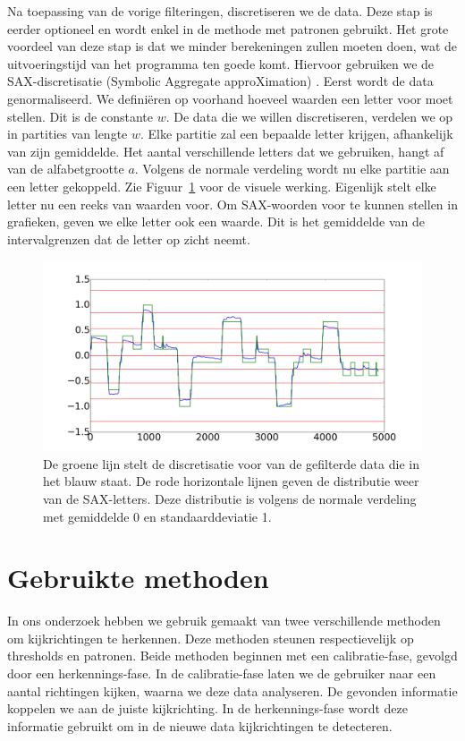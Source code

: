 \documentclass{article}
\begin{document}
Na toepassing van de vorige filteringen, discretiseren we de data. Deze stap is eerder optioneel en wordt enkel in de methode met patronen gebruikt. Het grote voordeel van deze stap is dat we minder berekeningen zullen moeten doen, wat de uitvoeringstijd van het programma ten goede komt. Hiervoor gebruiken we de SAX-discretisatie (Symbolic Aggregate approXimation) \cite{sax}. Eerst wordt de data genormaliseerd. We definiëren op voorhand hoeveel waarden een letter voor moet stellen. Dit is de constante $w$. De data die we willen discretiseren, verdelen we op in partities van lengte $w$. Elke partitie zal een bepaalde letter krijgen, afhankelijk van zijn gemiddelde. Het aantal verschillende letters dat we gebruiken, hangt af van de alfabetgrootte $a$. Volgens de normale verdeling wordt nu elke partitie aan een letter gekoppeld. Zie Figuur~\ref{fig:discretization} voor de visuele werking. Eigenlijk stelt elke letter nu een reeks van waarden voor. Om SAX-woorden voor te kunnen stellen in grafieken, geven we elke letter ook een waarde. Dit is het gemiddelde van de intervalgrenzen dat de letter op zicht neemt.

\begin{figure}[h]
\centering
\includegraphics[width=\linewidth]{images/sax_normaal_verdeling}
\caption{De groene lijn stelt de discretisatie voor van de gefilterde data die in het blauw staat. De rode horizontale lijnen geven de distributie weer van de SAX-letters. Deze distributie is volgens de normale verdeling met gemiddelde 0 en standaarddeviatie 1.}
\label{fig:discretization}
\end{figure}

\section{Gebruikte methoden}

In ons onderzoek hebben we gebruik gemaakt van twee verschillende methoden om kijkrichtingen te herkennen. Deze methoden steunen respectievelijk op thresholds en patronen. Beide methoden beginnen met een calibratie-fase, gevolgd door een herkennings-fase. In de calibratie-fase laten we de gebruiker naar een aantal richtingen kijken, waarna we deze data analyseren. De gevonden informatie koppelen we aan de juiste kijkrichting. In de herkennings-fase wordt deze informatie gebruikt om in de nieuwe data kijkrichtingen te detecteren.
\end{document}
